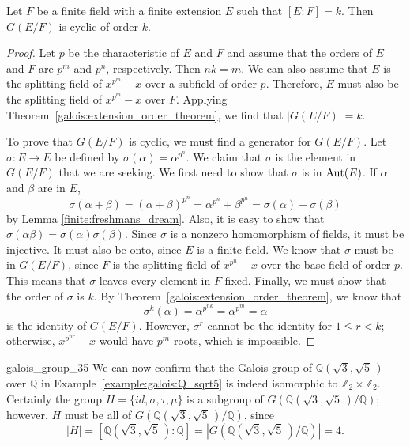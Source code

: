  
\begin{corollary}
Let $F$ be a finite field with a finite extension $E$ such that $[E:F]=k$. Then $G(E/F)$ is cyclic of order $k$.
\end{corollary}

\begin{proof}
Let $p$ be the characteristic of $E$ and $F$ and assume that the orders of $E$ and $F$ are $p^m$ and $p^n$, respectively.  Then $nk = m$.  We can also assume that $E$ is the splitting field of $x^{p^m} - x$
over a subfield of order $p$.  Therefore, $E$ must also be the splitting field of $x^{p^m} - x$ over $F$.  Applying Theorem~\ref{galois:extension_order_theorem}, we find that $|G(E/F)| = k$.     

To prove that $G(E/F)$ is cyclic, we must find a generator for $G(E/F)$.  Let $\sigma : E \rightarrow E$ be defined by $\sigma(\alpha) = \alpha^{p^n}$.  We claim that $\sigma$ is the element in $G(E/F)$ that
we are seeking.  We first need to show that $\sigma$ is in $\operatorname{Aut}(E)$.  If $\alpha$ and $\beta$ are in $E$,   
\[
\sigma(\alpha + \beta) = (\alpha + \beta)^{p^n}
= \alpha^{p^n} + \beta^{p^n} = \sigma(\alpha) + \sigma(\beta)
\]
by Lemma \ref{finite:freshmans_dream}.  Also, it is easy to show that $\sigma(\alpha \beta) = \sigma( \alpha ) \sigma( \beta )$. Since $\sigma$ is a nonzero homomorphism of fields, it must be injective.  It must also be onto, since $E$ is a finite field.  We know that $\sigma$ must be in $G(E/F)$, since $F$ is the splitting field of $x^{p^n} - x$ over the base field of order $p$. This means that $\sigma$ leaves every element in $F$ fixed.  Finally, we must show that the order of $\sigma$ is $k$. By Theorem~\ref{galois:extension_order_theorem}, we know that
\[
\sigma^k( \alpha ) = \alpha^{p^{nk}} = \alpha^{p^m} = \alpha
\]
is the identity of $G( E/F)$.  However, $\sigma^r$ cannot be the identity for $1 \leq r < k$; otherwise, $x^{p^{nr}} - x$ would have $p^m$ roots, which is impossible. 
\end{proof}

 

\begin{example}{galois_group_35}
We can now confirm that the Galois group of ${\mathbb Q}( \sqrt{3},
\sqrt{5}\, )$ over ${\mathbb Q}$ in Example~\ref{example:galois:Q_sqrt5} is indeed isomorphic to
${\mathbb Z}_2 \times {\mathbb Z}_2$.  Certainly the group $H = \{ id,
\sigma, \tau, \mu \}$ is a subgroup of $G({\mathbb Q}( \sqrt{3}, \sqrt{5}\,
)/{\mathbb Q})$; however,  $H$ must be all of $G({\mathbb Q}( \sqrt{3},
\sqrt{5}\, )/{\mathbb Q})$, since  
\[
|H| = [{\mathbb Q}( \sqrt{3}, \sqrt{5}\, ):{\mathbb Q}] = |G({\mathbb Q}(
\sqrt{3}, \sqrt{5}\, )/{\mathbb Q})| = 4.
\]
\end{example}
 

